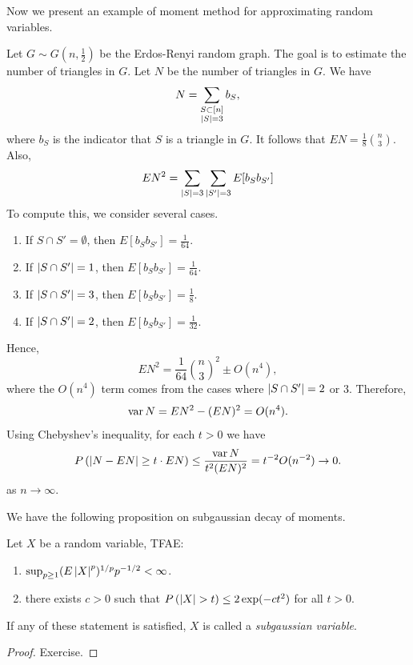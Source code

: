 \documentclass[a4paper]{article}
\begin{document}
Now we present an example of moment method for approximating random
variables.
\begin{eg}
  Let $G \sim G(n, \frac{1}{2})$ be the Erdos-Renyi random graph. The goal
  is to estimate the number of triangles in $G$. Let $N$ be
  the number of triangles in $G$. We have
  \[
    N = \sum_{\substack{S \subset [n] \\ \left\lvert S\right\rvert = 3}} b_S,
  \]
  where $b_S$ is the indicator that $S$ is a triangle in $G$.
  It follows that $E N = \frac{1}{8} \binom{n}{3}$. Also,
  \[
    E N^2 = \sum_{\left\lvert S\right\rvert = 3} \sum_{\left\lvert S'\right\rvert = 3} E [b_S b_{S'}]
  \]
  To compute this, we consider several cases.
  \begin{enumerate}
    \item If $S \cap S' = \emptyset$, then $E [b_S b_{S'}] = \frac{1}{64}$.
    \item If $\left\lvert S \cap S'\right\rvert = 1$, then $E [b_S b_{S'}] = \frac{1}{64}$.
    \item If $\left\lvert S \cap S'\right\rvert = 3$, then $E [b_S b_{S'}] = \frac{1}{8}$.
    \item If $\left\lvert S \cap S'\right\rvert = 2$, then $E [b_S b_{S'}] = \frac{1}{32}$.
  \end{enumerate}
  Hence,
  \[
    E N^2 = \frac{1}{64} \binom{n}{3}^2 \pm O(n^4),
  \]
  where the $O(n^4)$ term comes from the cases where $\left\lvert S \cap S'\right\rvert = 2$
  or $3$. Therefore,
  \[
    \operatorname{var} N = E N^2 - (E N)^2 = O(n^4).
  \]
  Using Chebyshev's inequality, for each $t > 0$ we have
  \[
    P \left( \left\lvert N - E N\right\rvert \geq t \cdot E N \right)
    \leq \frac{\operatorname{var} N}{t^2 (E N)^2} = t^{-2} O(n^{-2})
    \to 0.
  \]
  as $n \to \infty$.

\end{eg}

We have the following proposition on subgaussian decay of moments.
\begin{prop}
  Let $X$ be a random variable, TFAE:
  \begin{enumerate}
    \item $\sup_{p \geq 1} (E \left\lvert X\right\rvert^p)^{1 / p} p^{-1/2} < \infty$.
    \item there exists $c > 0$ such that $P \left( \left\lvert X\right\rvert > t \right)
            \leq 2 \exp (-c t^2)$ for all $t > 0$.
  \end{enumerate}
  If any of these statement is satisfied, $X$ is called a \emph{subgaussian
    variable}.
\end{prop}

\begin{proof}
  Exercise.

\end{proof}
\end{document}
